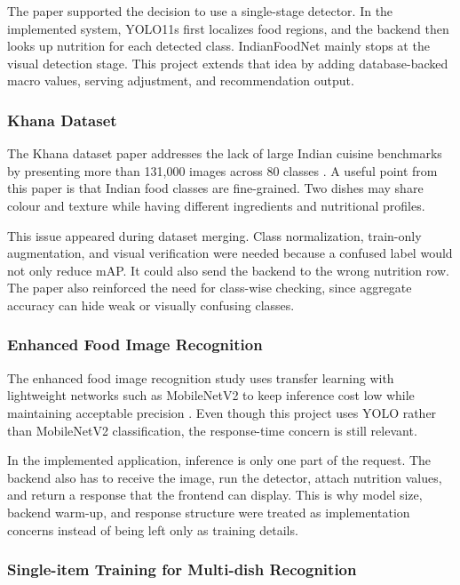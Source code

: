 The paper supported the decision to use a single-stage detector. In the implemented system, YOLO11s first localizes food regions, and the backend then looks up nutrition for each detected class. IndianFoodNet mainly stops at the visual detection stage. This project extends that idea by adding database-backed macro values, serving adjustment, and recommendation output.

\subsubsection{Khana Dataset}

The Khana dataset paper addresses the lack of large Indian cuisine benchmarks by presenting more than 131,000 images across 80 classes \cite{khana_dataset_2025}. A useful point from this paper is that Indian food classes are fine-grained. Two dishes may share colour and texture while having different ingredients and nutritional profiles.

This issue appeared during dataset merging. Class normalization, train-only augmentation, and visual verification were needed because a confused label would not only reduce mAP. It could also send the backend to the wrong nutrition row. The paper also reinforced the need for class-wise checking, since aggregate accuracy can hide weak or visually confusing classes.

\subsubsection{Enhanced Food Image Recognition}

The enhanced food image recognition study uses transfer learning with lightweight networks such as MobileNetV2 to keep inference cost low while maintaining acceptable precision \cite{enhanced_food_cnn_2024}. Even though this project uses YOLO rather than MobileNetV2 classification, the response-time concern is still relevant.

In the implemented application, inference is only one part of the request. The backend also has to receive the image, run the detector, attach nutrition values, and return a response that the frontend can display. This is why model size, backend warm-up, and response structure were treated as implementation concerns instead of being left only as training details.

\subsubsection{Single-item Training for Multi-dish Recognition}

